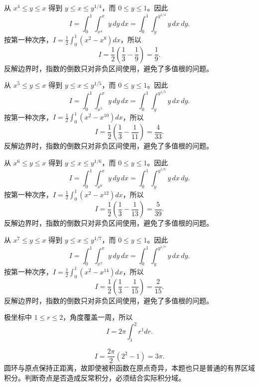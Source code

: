 \documentclass[12pt,fontset=fandol]{ctexart}
\begin{document}
\begin{solve}\label{ans:c37q9}
从 $x^{4}\le y\le x$ 得到 $y\le x\le y^{1/4}$，而 $0\le y\le1$。因此
\[
I=\int_0^1\int_{x^{4}}^x y\,dy\,dx=\int_0^1\int_y^{y^{1/4}}y\,dx\,dy.
\]
按第一种次序，$I=\frac12\int_0^1(x^2-x^{8})dx$，所以
\[
I=\frac12\left(\frac13-\frac1{9}\right)=\frac{1}{9}.
\]
反解边界时，指数的倒数只对非负区间使用，避免了多值根的问题。
\end{solve}

\begin{solve}\label{ans:c37q10}
从 $x^{5}\le y\le x$ 得到 $y\le x\le y^{1/5}$，而 $0\le y\le1$。因此
\[
I=\int_0^1\int_{x^{5}}^x y\,dy\,dx=\int_0^1\int_y^{y^{1/5}}y\,dx\,dy.
\]
按第一种次序，$I=\frac12\int_0^1(x^2-x^{10})dx$，所以
\[
I=\frac12\left(\frac13-\frac1{11}\right)=\frac{4}{33}.
\]
反解边界时，指数的倒数只对非负区间使用，避免了多值根的问题。
\end{solve}

\begin{solve}\label{ans:c37q11}
从 $x^{6}\le y\le x$ 得到 $y\le x\le y^{1/6}$，而 $0\le y\le1$。因此
\[
I=\int_0^1\int_{x^{6}}^x y\,dy\,dx=\int_0^1\int_y^{y^{1/6}}y\,dx\,dy.
\]
按第一种次序，$I=\frac12\int_0^1(x^2-x^{12})dx$，所以
\[
I=\frac12\left(\frac13-\frac1{13}\right)=\frac{5}{39}.
\]
反解边界时，指数的倒数只对非负区间使用，避免了多值根的问题。
\end{solve}

\begin{solve}\label{ans:c37q12}
从 $x^{7}\le y\le x$ 得到 $y\le x\le y^{1/7}$，而 $0\le y\le1$。因此
\[
I=\int_0^1\int_{x^{7}}^x y\,dy\,dx=\int_0^1\int_y^{y^{1/7}}y\,dx\,dy.
\]
按第一种次序，$I=\frac12\int_0^1(x^2-x^{14})dx$，所以
\[
I=\frac12\left(\frac13-\frac1{15}\right)=\frac{2}{15}.
\]
反解边界时，指数的倒数只对非负区间使用，避免了多值根的问题。
\end{solve}

\begin{solve}\label{ans:c37q13}
极坐标中 $1\le r\le2$，角度覆盖一周，所以
\[
I=2\pi\int_1^2r^{1}dr.
\]

\[
I=\frac{2\pi}{2}(2^{2}-1)=3\pi.
\]
圆环与原点保持正距离，故即使被积函数在原点奇异，本题也只是普通的有界区域积分。判断奇点是否造成反常积分，必须结合实际积分域。
\end{solve}
\end{document}
